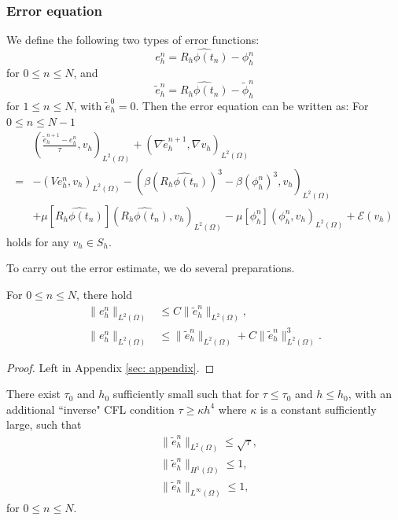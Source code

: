 \documentclass{siamart250211}
\def\nn{\nonumber}
\begin{document}
\subsubsection{Error equation}

We define the following two types of error functions:
\begin{equation*}
	e_h^n = \widehat{R_h\phi(t_{n})} - \phi_h^{n}
\end{equation*} 
for $0 \le n \le N$, and
\begin{equation*}
	\tilde{e}^n_h = \widehat{R_h\phi(t_{n})} - \tilde{\phi}_h^n
\end{equation*}
for $1 \le n \le N $, with $\tilde{e}_h^0 = 0$. Then the error equation can be written as: For $0 \le n \le N-1$ 
\begin{align}
	& \left( \frac{\tilde{e}_h^{n+1} - e_h^n}{\tau}, v_h \right)_{L^2(\Omega)} + (\nabla \tilde{e}_h^{n+1}, \nabla v_h)_{L^2(\Omega)} \nn \\
	= & - (V e_h^n, v_h)_{L^2(\Omega)} - (\beta (\widehat{R_h\phi(t_{n})})^3 - \beta (\phi_h^n)^3, v_h)_{L^2(\Omega)} \nn \\
	& + \mu[\widehat{R_h\phi(t_{n})}] (\widehat{R_h\phi(t_{n})},v_h)_{L^2(\Omega)} - \mu[\phi_h^n] (\phi_h^n,v_h)_{L^2(\Omega)}  + \mathcal{E}(v_h) \label{equ: error equation}
\end{align}
holds for any $v_h \in S_h$.

To carry out the error estimate, we do several preparations.
\begin{lemma}\label{lem: key lemma in geometry}
	For $ 0\le n \le N$, there hold
	\begin{align}
		\|e_h^n\|_{L^2(\Omega)} &\le C \|\tilde{e}_h^n\|_{L^2(\Omega)}, \label{equ: key lemma in geometry 1}\\
		\|e_h^n\|_{L^2(\Omega)} &\le \|\tilde{e}_h^n\|_{L^2(\Omega)} + C\|\tilde{e}_h^n\|_{L^2(\Omega)}^3. \label{equ: key lemma in geometry 2}
	\end{align}
\end{lemma}
\begin{proof}
    Left in Appendix \ref{sec: appendix}.
\end{proof}
\begin{lemma}\label{lem: induction}
There exist $\tau_0$ and $h_0$ sufficiently small such that for $\tau \le \tau_0$ and $h \le h_0$, with an additional ``inverse" CFL condition $\tau \ge \kappa h^4$ where $\kappa$ is a constant sufficiently large,  such that
\begin{align}
	& \|\tilde{e}_h^n\|_{L^2(\Omega)} \le \sqrt{\tau}, \label{equ: 1 in induction} \\
	& \|\tilde{e}_h^n\|_{H^1(\Omega)} \le 1, \label{equ: 2 in induction}\\
	& \|\tilde{e}_h^n\|_{L^{\infty}(\Omega)} \le 1, \label{equ: 3 in induction}
\end{align}
for $0 \le n \le N$.
\end{lemma}
\end{document}
